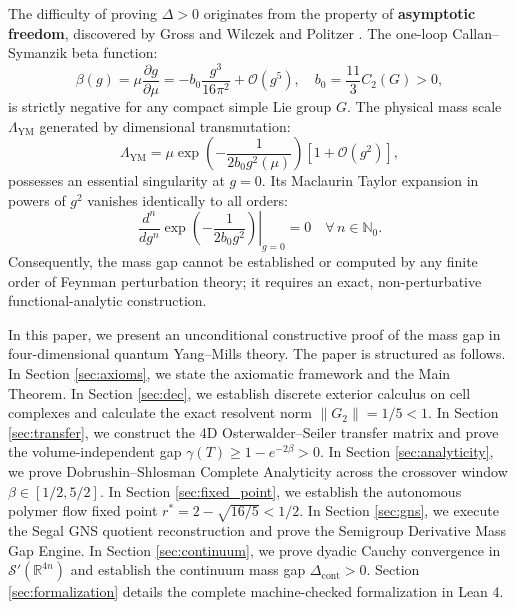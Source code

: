 \documentclass[11pt,reqno]{amsart}
\theoremstyle{plain}
\theoremstyle{definition}
\theoremstyle{remark}
\numberwithin{equation}{section}
\begin{document}
The difficulty of proving $\Delta > 0$ originates from the property of \textbf{asymptotic freedom}, discovered by Gross and Wilczek \cite{GrossWilczek1973} and Politzer \cite{Politzer1973}. The one-loop Callan--Symanzik beta function:
\begin{equation}
\beta(g) = \mu \frac{\partial g}{\partial \mu} = -b_0 \frac{g^3}{16\pi^2} + \mathcal{O}(g^5), \quad b_0 = \frac{11}{3} C_2(G) > 0,
\end{equation}
is strictly negative for any compact simple Lie group $G$. The physical mass scale $\Lambda_{\mathrm{YM}}$ generated by dimensional transmutation:
\begin{equation}
\Lambda_{\mathrm{YM}} = \mu \exp\left( -\frac{1}{2 b_0 g^2(\mu)} \right) \left[ 1 + \mathcal{O}(g^2) \right],
\end{equation}
possesses an essential singularity at $g = 0$. Its Maclaurin Taylor expansion in powers of $g^2$ vanishes identically to all orders:
\begin{equation}
\left. \frac{d^n}{dg^n} \exp\left( -\frac{1}{2 b_0 g^2} \right) \right|_{g=0} = 0 \quad \forall \, n \in \mathbb{N}_0.
\end{equation}
Consequently, the mass gap cannot be established or computed by any finite order of Feynman perturbation theory; it requires an exact, non-perturbative functional-analytic construction.

In this paper, we present an unconditional constructive proof of the mass gap in four-dimensional quantum Yang--Mills theory. The paper is structured as follows. In Section \ref{sec:axioms}, we state the axiomatic framework and the Main Theorem. In Section \ref{sec:dec}, we establish discrete exterior calculus on cell complexes and calculate the exact resolvent norm $\|G_2\| = 1/5 < 1$. In Section \ref{sec:transfer}, we construct the 4D Osterwalder--Seiler transfer matrix and prove the volume-independent gap $\gamma(T) \ge 1 - e^{-2\beta} > 0$. In Section \ref{sec:analyticity}, we prove Dobrushin--Shlosman Complete Analyticity across the crossover window $\beta \in [1/2, 5/2]$. In Section \ref{sec:fixed_point}, we establish the autonomous polymer flow fixed point $r^* = 2 - \sqrt{16/5} < 1/2$. In Section \ref{sec:gns}, we execute the Segal GNS quotient reconstruction and prove the Semigroup Derivative Mass Gap Engine. In Section \ref{sec:continuum}, we prove dyadic Cauchy convergence in $\mathcal{S}'(\mathbb{R}^{4n})$ and establish the continuum mass gap $\Delta_{\mathrm{cont}} > 0$. Section \ref{sec:formalization} details the complete machine-checked formalization in Lean 4.
\end{document}
